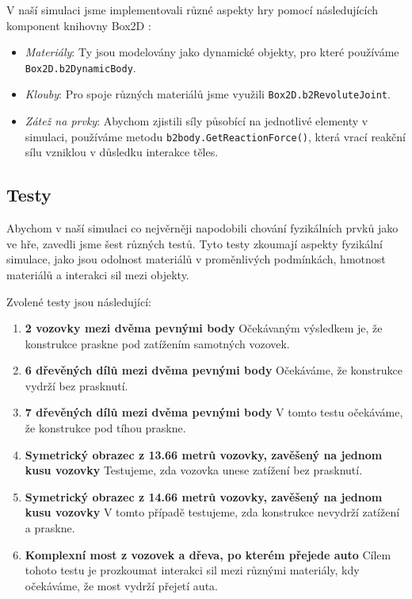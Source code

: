 V naší simulaci jsme implementovali různé aspekty hry pomocí následujících komponent knihovny Box2D \cite{b2docs}:

\begin{itemize}
    \item \emph{Materiály}: Ty jsou modelovány jako dynamické objekty, pro které používáme \texttt{Box2D.b2DynamicBody}.
    \item \emph{Klouby}: Pro spoje různých materiálů jsme využili \texttt{Box2D.b2RevoluteJoint}.
    \item \emph{Zátež na prvky}: Abychom zjistili síly působící na jednotlivé elementy v simulaci, používáme metodu \texttt{b2body.GetReactionForce()}, která vrací reakční sílu vzniklou v důsledku interakce těles.
\end{itemize}

\subsection{Testy}

Abychom v naší simulaci co nejvěrněji napodobili chování fyzikálních prvků jako ve hře, zavedli jsme šest různých testů. Tyto testy zkoumají aspekty fyzikální simulace, jako jsou odolnost materiálů v proměnlivých podmínkách, hmotnost materiálů a interakci sil mezi objekty.

Zvolené testy jsou následující:

\begin{enumerate}
    \item \textbf{2 vozovky mezi dvěma pevnými body} Očekávaným výsledkem je, že konstrukce praskne pod zatížením samotných vozovek.
    \item \textbf{6 dřevěných dílů mezi dvěma pevnými body} Očekáváme, že konstrukce vydrží bez prasknutí.
    \item \textbf{7 dřevěných dílů mezi dvěma pevnými body} V tomto testu očekáváme, že konstrukce pod tíhou praskne.
    \item \textbf{Symetrický obrazec z 13.66 metrů vozovky, zavěšený na jednom kusu vozovky} Testujeme, zda vozovka unese zatížení bez prasknutí.
    \item \textbf{Symetrický obrazec z 14.66 metrů vozovky, zavěšený na jednom kusu vozovky} V tomto případě testujeme, zda konstrukce nevydrží zatížení a praskne.
    \item \textbf{Komplexní most z vozovek a dřeva, po kterém přejede auto} Cílem tohoto testu je prozkoumat interakci sil mezi různými materiály, kdy očekáváme, že most vydrží přejetí auta.
\end{enumerate}


